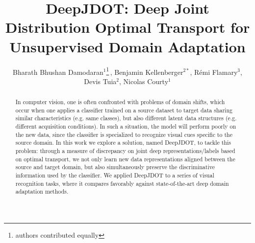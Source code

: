 \documentclass[runningheads]{llncs}
\begin{document}
\pagestyle{headings}



\mainmatter
\def\ECCV18SubNumber{2583}  

\title{DeepJDOT: Deep Joint Distribution Optimal Transport for Unsupervised Domain Adaptation}



\author{Bharath Bhushan Damodaran$^1$\thanks{authors contributed equally}\,, Benjamin Kellenberger$^{2*}$, R\'emi Flamary$^3$, Devis Tuia$^2$, Nicolas Courty$^1$}



 


\maketitle

\begin{abstract}
In computer vision, one is often confronted with problems of domain shifts, which occur when one applies a classifier trained on a source dataset to target data sharing similar characteristics (e.g. same classes), but also different latent data structures (e.g. different acquisition conditions). In such a situation, the model will perform poorly on the new data, since the classifier is specialized to recognize visual cues specific to the source domain. In this work we explore a solution, named DeepJDOT, to tackle this problem: through a measure of discrepancy on joint deep representations/labels based on optimal transport, we not only learn new data representations aligned between the source and target domain, but also simultaneously preserve the discriminative information used by the classifier.
We applied DeepJDOT to a series of visual recognition tasks, where it compares favorably against state-of-the-art deep domain adaptation methods.
\end{abstract}
\end{document}
